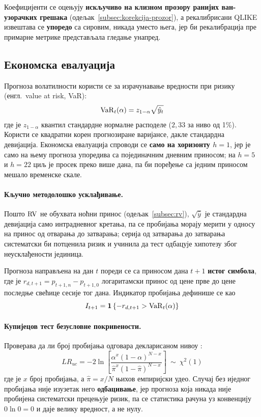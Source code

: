 Коефицијенти се оцењују \textbf{искључиво на клизном прозору ранијих ван-узорачких
грешака} (одељак~\ref{subsec:korekcija-prozor}), а рекалибрисани QLIKE извештава се
\textbf{упоредо} са сировим, никада уместо њега, јер би рекалибрација пре примарне
метрике представљала гледање унапред.

\subsection{Економска евалуација}
\label{subsec:var}

Прогноза волатилности користи се за израчунавање вредности при ризику (енгл.\ value at
risk, VaR):
\begin{equation}
\mathrm{VaR}_t(\alpha) = z_{1-\alpha}\sqrt{\hat{y}_t}
\end{equation}
где је $z_{1-\alpha}$ квантил стандардне нормалне расподеле ($2{,}33$ за ниво од 1\%).
Користи се квадратни корен прогнозиране варијансе, дакле стандардна девијација.
Економска евалуација спроводи се \textbf{само на хоризонту $h = 1$}, јер је само на
њему прогноза упоредива са појединачним дневним приносом; на $h = 5$ и $h = 22$ циљ је
просек преко више дана, па би поређење са једним приносом мешало временске скале.

\paragraph{Кључно методолошко усклађивање.}
Пошто $\mathrm{RV}$ не обухвата ноћни принос (одељак~\ref{subsec:rv}), $\sqrt{\hat{y}}$ је
стандардна девијација само интрадневног кретања, па се пробијања морају мерити у односу
на принос од отварања до затварања; серија од затварања до затварања систематски би
потценила ризик и учинила да тест одбацује хипотезу због неусклађености јединица.

Прогноза направљена на дан $t$ пореди се са приносом дана $t+1$ \textbf{истог
симбола}, где је $r_{d,t+1} = p_{t+1,n} - p_{t+1,0}$ логаритамски принос од цене прве
до цене последње свећице сесије тог дана. Индикатор пробијања дефинише се као
\begin{equation}
I_{t+1} = \mathbf{1}\left\{-r_{d,t+1} > \mathrm{VaR}_t(\alpha)\right\}
\end{equation}

\paragraph{Купијецов тест безусловне покривености.}
Проверава да ли број пробијања одговара декларисаном нивоу \parencite{kupiec1995}:
\begin{equation}
LR_{uc} = -2\ln\!\left[\frac{\alpha^{x}(1-\alpha)^{N-x}}
{\hat{\pi}^{x}(1-\hat{\pi})^{N-x}}\right]\ \sim\ \chi^{2}(1)
\end{equation}
где је $x$ број пробијања, а $\hat{\pi} = x/N$ њихов емпиријски удео. Случај без
иједног пробијања није изузетак него \textbf{одбацивање}, јер прогноза која никада није
пробијена систематски прецењује ризик, па се статистика рачуна уз конвенцију
$0\ln 0 = 0$ и даје велику вредност, а не нулу.

